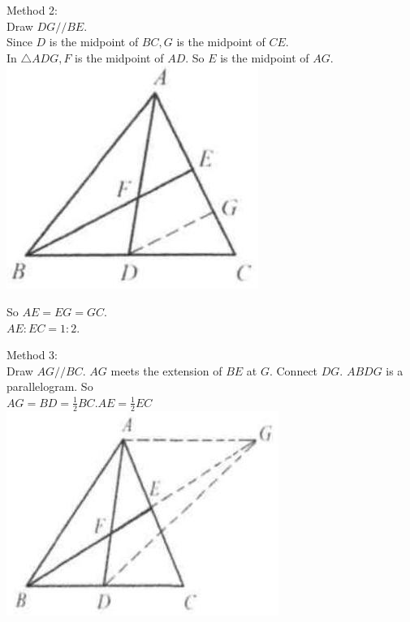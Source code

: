 \documentclass[10pt]{article}
\begin{document}
Method 2:\\
Draw \(D G / / B E\).\\
Since \(D\) is the midpoint of \(B C, G\) is the midpoint of \(C E\).\\
In \(\triangle A D G, F\) is the midpoint of \(A D\). So \(E\) is the midpoint of \(A G\).\\
\includegraphics[max width=\textwidth, center]{2025_04_17_97bc1f7e44d93c271a88g-131}

So \(A E=E G=G C\).\\
\(A E: E C=1: 2\).

Method 3:\\
Draw \(A G / / B C\). \(A G\) meets the extension of \(B E\) at \(G\). Connect \(D G\). \(A B D G\) is a parallelogram. So\\
\(A G=B D=\frac{1}{2} B C . A E=\frac{1}{2} E C\)\\
\includegraphics[max width=\textwidth, center]{2025_04_17_97bc1f7e44d93c271a88g-131(2)}
\end{document}
